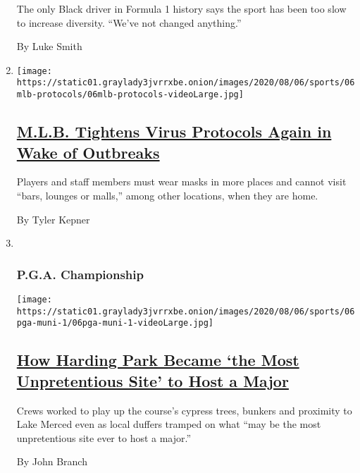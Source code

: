 \begin{enumerate}
  The only Black driver in Formula 1 history says the sport has been too
  slow to increase diversity. ``We've not changed anything.''

  By Luke Smith
\item
  \texttt{[image: https://static01.graylady3jvrrxbe.onion/images/2020/08/06/sports/06mlb-protocols/06mlb-protocols-videoLarge.jpg]}

  \hypertarget{mlb-tightens-virus-protocols-again-in-wake-of-outbreaks}{%
  \subsection{\texorpdfstring{\href{/2020/08/06/sports/baseball/mlb-safety-protocols.html}{M.L.B.
  Tightens Virus Protocols Again in Wake of
  Outbreaks}}{M.L.B. Tightens Virus Protocols Again in Wake of Outbreaks}}\label{mlb-tightens-virus-protocols-again-in-wake-of-outbreaks}}

  Players and staff members must wear masks in more places and cannot
  visit ``bars, lounges or malls,'' among other locations, when they are
  home.

  By Tyler Kepner
\item ~
  \hypertarget{pga-championship}{%
  \subsubsection{P.G.A. Championship}\label{pga-championship}}

  \texttt{[image: https://static01.graylady3jvrrxbe.onion/images/2020/08/06/sports/06pga-muni-1/06pga-muni-1-videoLarge.jpg]}

  \hypertarget{how-harding-park-became-the-most-unpretentious-site-to-host-a-major}{%
  \subsection{\texorpdfstring{\href{/2020/08/06/sports/golf/pga-championship-harding-park.html}{How
  Harding Park Became `the Most Unpretentious Site' to Host a
  Major}}{How Harding Park Became `the Most Unpretentious Site' to Host a Major}}\label{how-harding-park-became-the-most-unpretentious-site-to-host-a-major}}

  Crews worked to play up the course's cypress trees, bunkers and
  proximity to Lake Merced even as local duffers tramped on what ``may
  be the most unpretentious site ever to host a major.''

  By John Branch
\end{enumerate}


